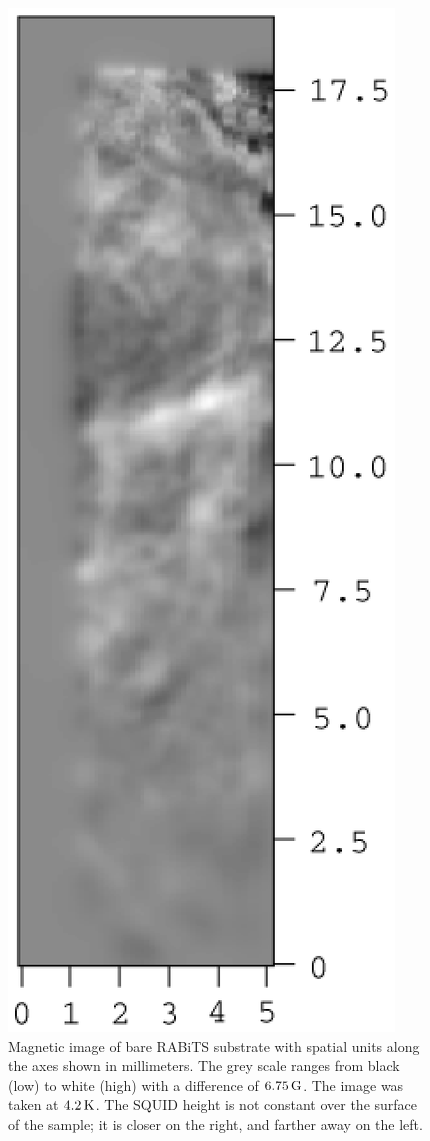 %
%
\begin{figure}[p]
\includegraphics{figs/magpen/fig3.ps}
\caption[Magnetic image of bare RABiTS substrate.]
{Magnetic image of bare RABiTS substrate with spatial units along the
axes shown in millimeters.  The grey scale ranges from
black (low) to white (high) with a difference of  $6.75\,\Gauss$.
The image was taken at $4.2\,\kelvin$. The SQUID height is not 
constant over the surface of the sample; it is closer on the right,
and farther away on the left.}
\label{fig:naked_rabits} 
\end{figure}

